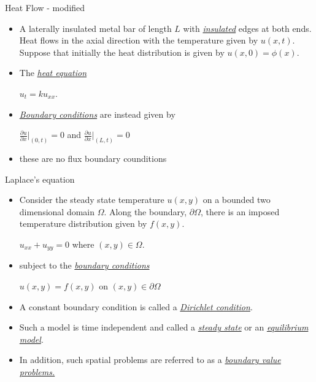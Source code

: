 \documentclass[t,10pt,fleqn]{beamer}
\def\ds{\displaystyle}
\def\d{\partial}
\newcommand{\tu}[1]{\underline{\textit{#1}}}
\begin{document}
\begin{frame}

\begin{block}{Heat Flow - modified}
\begin{itemize}
    \pause
      \item  A laterally insulated metal bar of length $L$ with \tu{insulated} edges at both ends.  Heat flows in the axial direction with the temperature given by $u(x,t)$.  Suppose that initially the heat distribution is given by $u(x,0) = \phi(x)$.
          \pause
      \item The \tu{heat equation} 
      \begin{center}
            $u_t = k u_{xx}$.
      \end{center}
         \pause
      \item \tu{Boundary conditions} are instead given by
            \begin{center}
            $\ds \frac{\d u}{\d x}\biggr |_{(0,t)}= 0$ and $\ds \frac{\d u}{\d x}\biggr |_{(L,t)}= 0$
      \end{center}
               \pause
      \item these are no flux boundary counditions
       \end{itemize}
  \end{block}
  
 \end{frame}
\begin{frame}

\begin{block}{Laplace's equation}
\begin{itemize}
    \pause
      \item  Consider the steady state temperature $u(x,y)$ on a bounded two dimensional domain $\Omega$.  Along the boundary, $\d \Omega$, there is an imposed temperature distribution given by $f(x,y)$.
          \pause 
      \begin{center}
            $u_{xx}+u_{yy}=0$ where $(x,y) \in \Omega$.
      \end{center}
         \pause
      \item subject to the \tu{boundary conditions} 
            \begin{center}
            $u(x,y)= f(x,y)$ on  $(x,y) \in \d \Omega$  
      \end{center}
      \pause
      \item A  constant boundary condition is called a \tu{Dirichlet condition}.
               \pause
      \item Such a model is time independent  and called a \tu{steady state} or an \tu{equilibrium model}.        
      \pause
       \item In addition, such spatial problems are referred to as a \tu{boundary value problems.}
      
       \end{itemize}
  \end{block}
  
 \end{frame}
\end{document}
